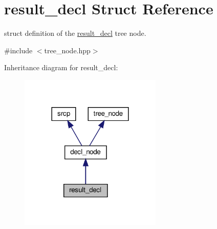 \hypertarget{structresult__decl}{}\section{result\+\_\+decl Struct Reference}
\label{structresult__decl}


struct definition of the \hyperlink{structresult__decl}{result\+\_\+decl} tree node.  




{\ttfamily \#include $<$tree\+\_\+node.\+hpp$>$}



Inheritance diagram for result\+\_\+decl\+:
\nopagebreak
\begin{figure}[H]
\begin{center}
\leavevmode
\includegraphics[width=192pt]{de/d68/structresult__decl__inherit__graph}
\end{center}
\end{figure}



